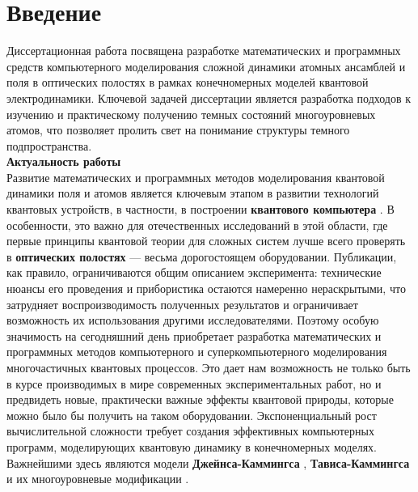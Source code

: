 \chapter*{Введение}                         %

\newcommand{\actuality}{}
\newcommand{\progress}{}
\newcommand{\aim}{{\textbf\aimTXT}}
\newcommand{\tasks}{\textbf{\tasksTXT}}
\newcommand{\novelty}{\textbf{\noveltyTXT}}
\newcommand{\influence}{\textbf{\influenceTXT}}
\newcommand{\contribution}{\textbf{\contributionTXT}}
\newcommand{\publications}{\textbf{\publicationsTXT}}

Диссертационная работа посвящена разработке математических и про­граммных средств компьютерного моделирования сложной динамики атомных ансамблей и поля в оптических полостях в рамках конечномерных моделей квантовой электродинамики. Ключевой задачей диссертации является разра­ботка подходов к изучению и практическому получению темных состояний многоуровневых атомов, что позволяет пролить свет на понимание структуры темного подпространства.
\\[24pt]
\indent\textbf{Актуальность работы}\\
\indent Развитие математических и программных методов моделирования кванто­вой динамики поля и атомов является ключевым этапом в развитии технологий квантовых устройств, в частности, в построении \textbf{квантового компьютера} \cite{feynman,quantum_computing_zalka,valiev_1,valiev_2}. В особенности, это важно для отечественных исследований в этой об­ласти, где первые принципы квантовой теории для сложных систем лучше всего проверять в \textbf{оптических полостях} \cite{cavity_exp_1,cavity_exp_2,cavity_exp_3} --- весьма дорогостоящем оборудовании. Публикации, как правило, ограничиваются общим описанием эксперимента: технические нюансы его проведения и прибористика остают­ся намеренно нераскрытыми, что затрудняет воспроизводимость полученных результатов и ограничивает возможность их использования другими иссле­дователями. Поэтому особую значимость на сегодняшний день приобретает разработка математических и программных методов компьютерного и супер­компьютерного моделирования многочастичных квантовых процессов. Это дает нам возможность не только быть в курсе производимых в мире современных экс­периментальных работ, но и предвидеть новые, практически важные эффекты квантовой природы, которые можно было бы получить на таком оборудова­нии. Экспоненциальный рост вычислительной сложности \cite{feynman} требует создания эффективных компьютерных программ, моделирующих квантовую динамику в конечномерных моделях. Важнейшими здесь являются модели \textbf{Джейнса-Кам­мингса} \cite{jc_comparison,jc_qudit,jc_ladder,jc_descendants,jc_phase_transition}, \textbf{Тависа-Каммингса} \cite{tc_exact_solution,tc_a_study,tc_dicke_2,tc_improvement,tc_experimental} и их многоуровневые модификации \cite{jc_tc_extension_1,jc_tc_extension_2,jc_tc_extension_3}.

